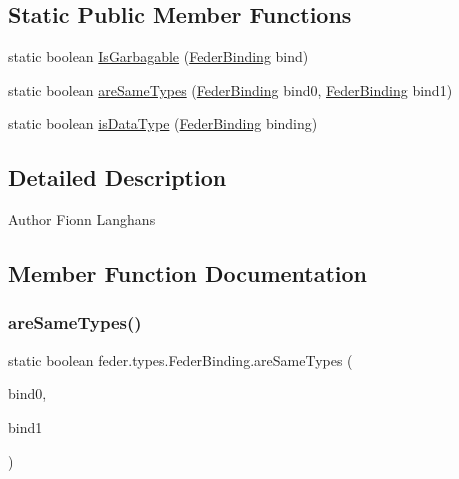 \subsection*{Static Public Member Functions}
\begin{DoxyCompactItemize}
\item 
static boolean \hyperlink{classfeder_1_1types_1_1FederBinding_a25f8e1f9d64b08dc98c7be9bf931e479}{Is\+Garbagable} (\hyperlink{classfeder_1_1types_1_1FederBinding}{Feder\+Binding} bind)
\item 
static boolean \hyperlink{classfeder_1_1types_1_1FederBinding_aefeac9d1325508287fb394ab0a6c54a3}{are\+Same\+Types} (\hyperlink{classfeder_1_1types_1_1FederBinding}{Feder\+Binding} bind0, \hyperlink{classfeder_1_1types_1_1FederBinding}{Feder\+Binding} bind1)
\item 
static boolean \hyperlink{classfeder_1_1types_1_1FederBinding_a2c04e0db9889dacd7ad0c5a839797c2f}{is\+Data\+Type} (\hyperlink{classfeder_1_1types_1_1FederBinding}{Feder\+Binding} binding)
\end{DoxyCompactItemize}


\subsection{Detailed Description}
\begin{DoxyAuthor}{Author}
Fionn Langhans 
\end{DoxyAuthor}


\subsection{Member Function Documentation}
\mbox{\label{classfeder_1_1types_1_1FederBinding_aefeac9d1325508287fb394ab0a6c54a3}} 
\subsubsection{\texorpdfstring{are\+Same\+Types()}{areSameTypes()}}
{\footnotesize\ttfamily static boolean feder.\+types.\+Feder\+Binding.\+are\+Same\+Types (\begin{DoxyParamCaption}\item[{\hyperlink{classfeder_1_1types_1_1FederBinding}{Feder\+Binding}}]{bind0,  }\item[{\hyperlink{classfeder_1_1types_1_1FederBinding}{Feder\+Binding}}]{bind1 }\end{DoxyParamCaption})\hspace{0.3cm}{\ttfamily [static]}}


